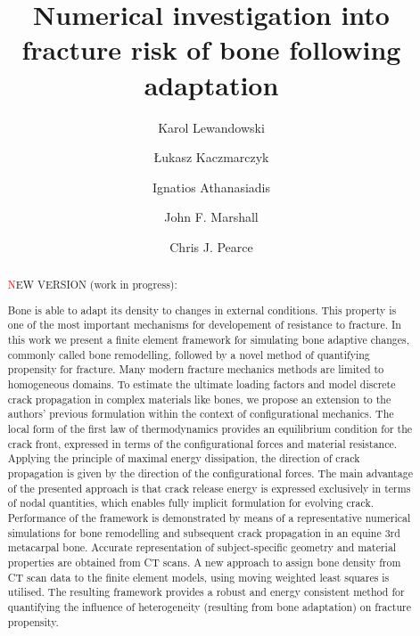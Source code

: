 \documentclass[review]{elsarticle}
\numberwithin{equation}{section}
\begin{document}

\begin{frontmatter}

\title{Numerical investigation into fracture risk of bone following adaptation}

\author[gla]{Karol Lewandowski}
\author[gla]{{\L}ukasz Kaczmarczyk}
\author[gla]{Ignatios Athanasiadis}
\author[gla]{John F. Marshall}
\author[gla]{Chris J. Pearce}
\address[gla]{The James Watt School of Engineering, University of Glasgow, Glasgow, G12 8QQ, UK.}

\begin{abstract}
	
\textcolor{red} NEW VERSION (work in progress):

	Bone is able to adapt its density to changes in external conditions. This property is one of the most important mechanisms for developement of resistance to fracture. In this work we present a finite element framework for simulating bone adaptive changes, commonly called bone remodelling, followed by a novel method of quantifying propensity for fracture. Many modern fracture mechanics methods are limited to homogeneous domains. To estimate the ultimate loading factors and model discrete crack propagation in complex materials like bones, we propose an extension to the authors’ previous formulation within the context of configurational mechanics. The local form of the first law of thermodynamics provides an equilibrium condition for the crack front, expressed in terms of the configurational forces and material resistance. Applying the principle of maximal energy dissipation, the direction of crack propagation is given by the direction of the configurational forces. The main advantage of the presented approach is that crack release energy is expressed exclusively in terms of nodal quantities, which enables fully implicit formulation for evolving crack.
	Performance of the framework is demonstrated by means of a representative numerical simulations for bone remodelling and subsequent crack propagation in an equine 3rd metacarpal bone. Accurate representation of subject-specific geometry and material properties are obtained from CT scans. A new approach to assign bone density from CT scan data to the finite element models, using moving weighted least squares is utilised. 
	The resulting framework provides a robust and energy consistent method for quantifying the influence of heterogeneity (resulting from bone adaptation) on fracture propensity. 


\end{abstract}
\end{frontmatter}
\end{document}
